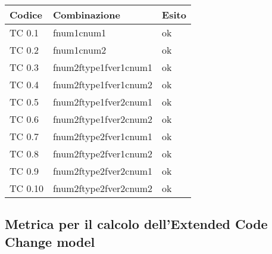\vspace{1cm}

\begin{tabular}{|p{3cm}|p{7cm}|p{3cm}|}
	\hline
	\rowcolor{Gray}
	\textbf{Codice} & \textbf{Combinazione} & \textbf{Esito}\tabularnewline
	\hline
	TC 0.1			& fnum1cnum1			& ok \tabularnewline
	\hline
	TC 0.2			& fnum1cnum2			& ok \tabularnewline
	\hline
	TC 0.3			& fnum2ftype1fver1cnum1		& ok \tabularnewline
	\hline
	TC 0.4			& fnum2ftype1fver1cnum2		& ok \tabularnewline
	\hline
	TC 0.5			& fnum2ftype1fver2cnum1		& ok \tabularnewline
	\hline
	TC 0.6			& fnum2ftype1fver2cnum2		& ok \tabularnewline
	\hline
	TC 0.7			& fnum2ftype2fver1cnum1		& ok \tabularnewline
	\hline
	TC 0.8			& fnum2ftype2fver1cnum2		& ok \tabularnewline
	\hline
	TC 0.9			& fnum2ftype2fver2cnum1		& ok \tabularnewline
	\hline
	TC 0.10			&fnum2ftype2fver2cnum2		& ok \tabularnewline
	\hline
\end{tabular}
\clearpage




\subsection{Metrica per il calcolo dell'Extended Code Change model}

